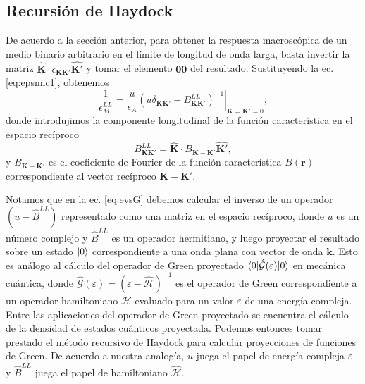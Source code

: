 \documentclass[12pt]{article}
\begin{document}
\subsection{Recursión de Haydock}\label{sec:haydock}
De acuerdo a la sección anterior, para obtener la respuesta
macroscópica de un medio binario arbitrario en el límite de longitud
de onda larga, basta invertir la matriz $\hat{\bm K}\cdot\epsilon_{\bm K\bm
  K'}\hat{\bm K'}$ y tomar el elemento $\bm 0\bm 0$ del resultado. Sustituyendo la
ec. \eqref{eq:epsmic1}, obtenemos
\begin{equation}
  \label{eq:evsG}
  \frac{1}{\epsilon_M^{LL}}=\frac{u}{\epsilon_A}\left.(u\delta_{\bm K\bm
    K'}-B^{LL}_{\bm K\bm K'})^{-1}\right|_{\bm K=\bm K'=0},
\end{equation}
donde introdujimos la componente longitudinal de la función
característica en el espacio recíproco
\begin{equation}
  \label{eq:BLL}
  B^{LL}_{\bm K\bm K'}=\hat{\bm K}\cdot B_{\bm K-\bm K'}\hat{\bm K'},
\end{equation}
y $B_{\bm K-\bm K'}$ es el coeficiente de Fourier de la función
característica $B(\bm r)$ correspondiente al vector recíproco $\bm
K-\bm K'$.

Notamos que en la ec. \eqref{eq:evsG} debemos calcular el inverso de un
operador $(u-\hat B^{LL})$ representado como una matriz en el espacio
recíproco, donde $u$ es un número complejo y $\hat B^{LL}$ es un
operador hermitiano, y luego proyectar el resultado sobre un estado
$\ket{0}$ correspondiente a una onda plana con vector de onda $\bm
k$. Esto es análogo al cálculo del operador de Green proyectado
$\braket{0|\hat{\mathcal G}(\varepsilon)|0}$ en mecánica cuántica, donde
$\hat{\mathcal G}(\varepsilon)=(\varepsilon-\hat{\mathcal H})^{-1}$ es el operador
de Green correspondiente a un operador hamiltoniano ${\mathcal H}$
evaluado para un valor $\varepsilon$ de una energía compleja. Entre
las aplicaciones del operador de Green proyectado se encuentra el
cálculo de la densidad de estados cuánticos proyectada. Podemos
entonces tomar prestado el método recursivo de Haydock
\cite{haydock} para calcular proyecciones de funciones de Green. De
acuerdo a nuestra analogía, $u$ juega el papel de
energía compleja $\varepsilon$ y $\hat B^{LL}$ juega el papel de
hamiltoniano $\hat {\mathcal H}$.
\end{document}
